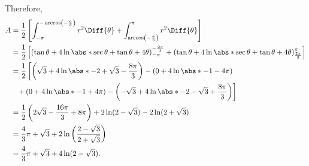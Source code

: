 \begin{enumerate}
          Therefore,
          \begin{align*}
              A & = \frac{1}{2}\left[\int_{-\pi}^{-\arccos\left(-\frac{a}{b}\right)} r^2 \Diff{\theta} + \int_{\arccos\left(-\frac{a}{b}\right)}^{\pi} r^2 \Diff{\theta}\right]                                                          \\
                & = \frac{1}{2} \left[\left(\tan\theta + 4\ln\abs*{\sec\theta+\tan\theta} + 4\theta\right)^{-\frac{2\pi}{3}}_{-\pi} + \left(\tan\theta + 4\ln\abs*{\sec\theta+\tan\theta} + 4\theta\right)^{\pi}_{\frac{2\pi}{3}}\right] \\
                & = \frac{1}{2} \left[\left(\sqrt{3} + 4\ln\abs*{-2+\sqrt{3}} - \frac{8\pi}{3}\right) - \left(0 + 4\ln\abs*{-1} - 4\pi\right)\right.                                                                                     \\
                & \phantom{=} \left.+ \left(0 + 4\ln\abs*{-1} + 4\pi\right) - \left(-\sqrt{3} + 4\ln\abs*{-2-\sqrt{3}} + \frac{8\pi}{3}\right)\right]                                                                                    \\
                & = \frac{1}{2} \left(2\sqrt{3} - \frac{16\pi}{3} + 8\pi\right) + 2\ln(2 - \sqrt{3}) - 2\ln(2 + \sqrt{3})                                                                                                                \\
                & = \frac{4}{3}\pi + \sqrt{3} + 2\ln\left(\frac{2 - \sqrt{3}}{2 + \sqrt{3}}\right)                                                                                                                                       \\
                & = \frac{4}{3}\pi + \sqrt{3} + 4\ln(2 - \sqrt{3}).
          \end{align*}
\end{enumerate}